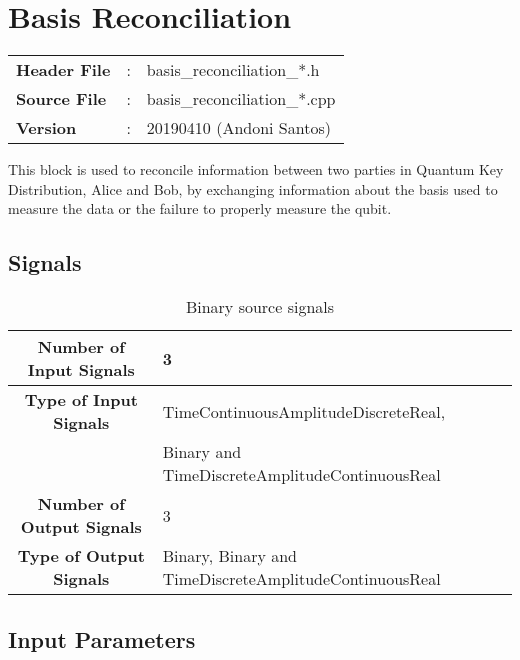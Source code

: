 \clearpage
\graphicspath{{./lib/basis_reconciliation/figures/}}
\section{Basis Reconciliation}

\begin{tcolorbox}	
	\begin{tabular}{p{2.75cm} p{0.2cm} p{10.5cm}} 	
		\textbf{Header File}   &:& basis\_reconciliation\_*.h \\
		\textbf{Source File}   &:& basis\_reconciliation\_*.cpp \\
        \textbf{Version}       &:& 20190410 (Andoni Santos)
	\end{tabular}
\end{tcolorbox}

\maketitle
This block is used to reconcile information between two parties in Quantum Key
Distribution, Alice and Bob, by exchanging information about the basis used to
measure the data or the failure to properly measure the qubit.

\subsection*{Signals}

\begin{table}[h]
	\begin{tabular}{|c|l|}
		\hline
		\textbf{Number of Input Signals} & 3 \\ \hline
        \textbf{Type of Input Signals} & TimeContinuousAmplitudeDiscreteReal,
		 \\
		& Binary and TimeDiscreteAmplitudeContinuousReal \\ \hline
    	\textbf{Number of Output Signals} & 3 \\ \hline
        \textbf{Type of Output Signals} & Binary, Binary and TimeDiscreteAmplitudeContinuousReal \\ \hline
	\end{tabular}
	\caption{Binary source signals}
	\label{table:basis_recon_signals}
\end{table}

\subsection*{Input Parameters}

